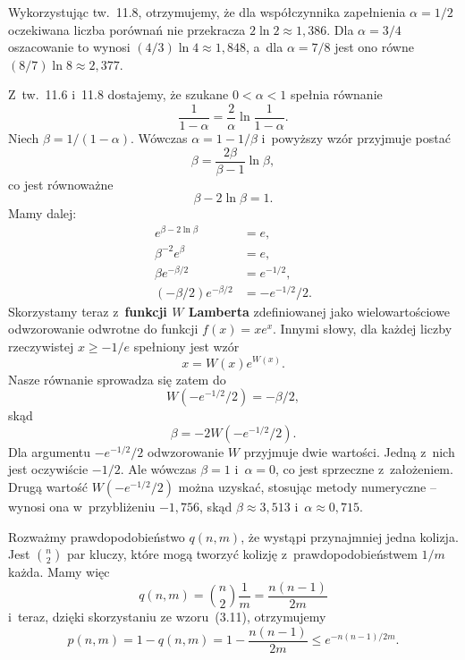 \exercise %
Wykorzystując tw.~11.8, otrzymujemy, że dla współczynnika zapełnienia $\alpha=1/2$ oczekiwana liczba porównań nie przekracza $2\ln2\approx1{,}386$. Dla $\alpha=3/4$ oszacowanie to wynosi $(4/3)\ln4\approx1{,}848$, a~dla $\alpha=7/8$ jest ono równe $(8/7)\ln8\approx2{,}377$.

\exercise %
Z~tw.~11.6 i~11.8 dostajemy, że szukane $0<\alpha<1$ spełnia równanie
\[
	\frac{1}{1-\alpha} = \frac{2}{\alpha}\ln\frac{1}{1-\alpha}.
\]
Niech $\beta=1/(1-\alpha)$. Wówczas $\alpha=1-1/\beta$ i~powyższy wzór przyjmuje postać
\[
	\beta = \frac{2\beta}{\beta-1}\ln\beta,
\]
co jest równoważne
\[
	\beta-2\ln\beta = 1.
\]
Mamy dalej:
\begin{align*}
	e^{\beta-2\ln\beta} &= e, \\
	\beta^{-2}e^\beta &= e, \\
	\beta e^{-\beta/2} &= e^{-1/2}, \\
	(-\beta/2)e^{-\beta/2} &= -e^{-1/2}\!/2.
\end{align*}
Skorzystamy teraz z~\textbf{funkcji $W$ Lamberta} \cite{lambertwfunction} zdefiniowanej jako wielowartościowe odwzorowanie odwrotne do funkcji $f(x)=xe^x$. Innymi słowy, dla każdej liczby rzeczywistej $x\ge-1/e$ spełniony jest wzór
\[
	x = W(x)e^{W(x)}.
\]
Nasze równanie sprowadza się zatem do
\[
	W(-e^{-1/2}\!/2) = -\beta/2,
\]
skąd
\[
	\beta = -2W(-e^{-1/2}\!/2).
\]
Dla argumentu $-e^{-1/2}\!/2$ odwzorowanie $W$ przyjmuje dwie wartości. Jedną z~nich jest oczywiście $-1/2$. Ale wówczas $\beta=1$ i~$\alpha=0$, co jest sprzeczne z~założeniem. Drugą wartość $W(-e^{-1/2}\!/2)$ można uzyskać, stosując metody numeryczne -- wynosi ona w~przybliżeniu $-1{,}756$, skąd $\beta\approx3{,}513$ i~$\alpha\approx0{,}715$.


\exercise %

\noindent Rozważmy prawdopodobieństwo $q(n,m)$, że wystąpi przynajmniej jedna kolizja. Jest $\binom{n}{2}$ par kluczy, które mogą tworzyć kolizję z~prawdopodobieństwem $1/m$ każda. Mamy więc
\[
	q(n,m) = \binom{n}{2}\frac{1}{m} = \frac{n(n-1)}{2m}
\]
i~teraz, dzięki skorzystaniu ze wzoru~(3.11), otrzymujemy
\[
	p(n,m) = 1-q(n,m) = 1-\frac{n(n-1)}{2m} \le e^{-n(n-1)/2m}.
\]


